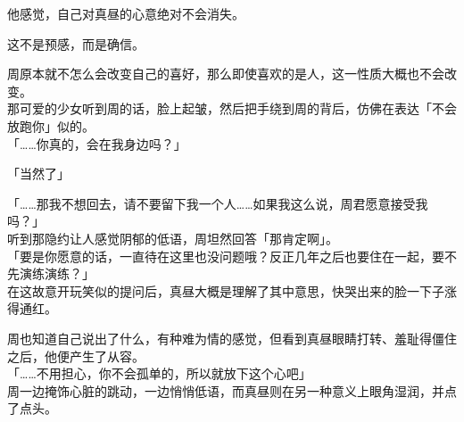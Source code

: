 他感觉，自己对真昼的心意绝对不会消失。

这不是预感，而是确信。

周原本就不怎么会改变自己的喜好，那么即使喜欢的是人，这一性质大概也不会改变。\\

那可爱的少女听到周的话，脸上起皱，然后把手绕到周的背后，仿佛在表达「不会放跑你」似的。\\

「……你真的，会在我身边吗？」

「当然了」

「……那我不想回去，请不要留下我一个人……如果我这么说，周君愿意接受我吗？」\\

听到那隐约让人感觉阴郁的低语，周坦然回答「那肯定啊」。\\

「要是你愿意的话，一直待在这里也没问题哦？反正几年之后也要住在一起，要不先演练演练？」\\

在这故意开玩笑似的提问后，真昼大概是理解了其中意思，快哭出来的脸一下子涨得通红。

周也知道自己说出了什么，有种难为情的感觉，但看到真昼眼睛打转、羞耻得僵住之后，他便产生了从容。\\

「……不用担心，你不会孤单的，所以就放下这个心吧」\\

周一边掩饰心脏的跳动，一边悄悄低语，而真昼则在另一种意义上眼角湿润，并点了点头。
